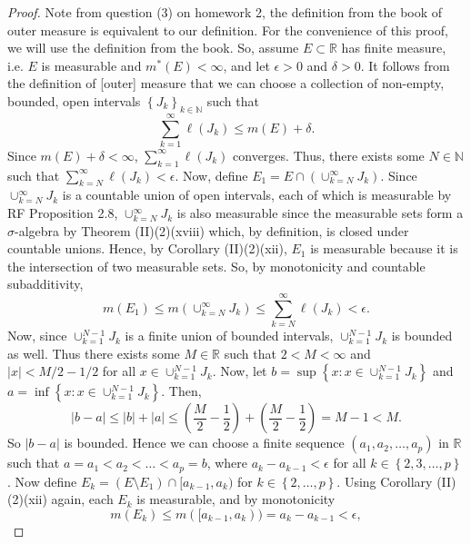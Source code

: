 \documentclass[12pt]{article}
\begin{document}
\begin{proof}
Note from question (3) on homework 2, the definition from the book of outer measure is equivalent to our definition. For the convenience of this
proof, we will use the definition from the book. So, assume $E \subset \mathbb{R}$ has finite measure, i.e. $E$ is measurable and $m^{*}(E) <
\infty$, and let $\epsilon > 0$ and $\delta > 0$. It follows from
the definition of [outer] measure that we can choose a collection of non-empty, bounded, open intervals $\left\{ J_{k} \right\}_{k\in\mathbb{N}}$ such that 
\[ \sum_{k=1}^{\infty}\ell(J_{k}) \leq m(E) + \delta. \]
Since $m(E) + \delta < \infty$, $\sum_{k=1}^{\infty}\ell(J_{k})$ converges. Thus, there exists some $N \in \mathbb{N}$ such that
$\sum_{k=N}^{\infty}\ell(J_{k}) < \epsilon$. Now, define $E_{1} = E\cap \left( \cup_{k=N}^{\infty}J_{k} \right)$. Since $\cup_{k=N}^{\infty}J_{k}$ is
a countable union of open intervals, each of which is measurable by RF Proposition 2.8, $\cup_{k=N}^{\infty}J_{k}$ is also measurable since the measurable
sets form a $\sigma$-algebra by Theorem (II)(2)(xviii) which, by definition, is closed under countable unions. Hence, by Corollary (II)(2)(xii), $E_{1}$ 
is measurable because it is the intersection of two measurable sets. So, by monotonicity and countable subadditivity,
\begin{equation}
m(E_{1}) \leq m\left( \cup_{k=N}^{\infty}J_{k} \right) \leq \sum_{k=N}^{\infty}\ell(J_{k}) < \epsilon.
\label{eqn:3-0}
\end{equation}
Now, since
$\cup_{k=1}^{N-1}J_{k}$ is a finite union of bounded intervals, $\cup_{k=1}^{N-1}J_{k}$ is bounded as well. Thus there exists some $M \in \mathbb{R}$ 
such that $2 < M < \infty$ and
$|x| < M/2 - 1/2$ for all $x \in \cup_{k=1}^{N-1}J_{k}$. Now, let $b = \sup\left\{ x : x \in \cup_{k=1}^{N-1}J_{k} \right\}$ and $a = \inf\left\{
x : x \in \cup_{k=1}^{N-1}J_{k} \right\}$. Then,
\[ |b -a | \leq |b| + |a| \leq \left( \frac{M}{2} - \frac{1}{2} \right) + \left( \frac{M}{2} - \frac{1}{2} \right) = M - 1 < M. \]
So $|b - a|$ is bounded. Hence we can choose a finite sequence $(a_{1}, a_{2}, \dots, a_{p})$ in $\mathbb{R}$ such that $a = a_{1} < a_{2} < \dots <
a_{p} = b$, where $a_{k} - a_{k-1} < \epsilon$ for all $k \in \left\{ 2, 3, \dots, p \right\}$. Now define $E_{k} = \left( E\setminus E_{1}
\right)\cap [a_{k-1}, a_{k})$ for $k \in \left\{ 2, \dots, p \right\}$. Using Corollary (II)(2)(xii) again, each $E_{k}$ is measurable, and by monotonicity 
\begin{equation}
m(E_{k}) \leq m([a_{k-1}, a_{k}))  = a_{k} - a_{k-1} < \epsilon,

\end{equation}
\end{proof}
\end{document}
